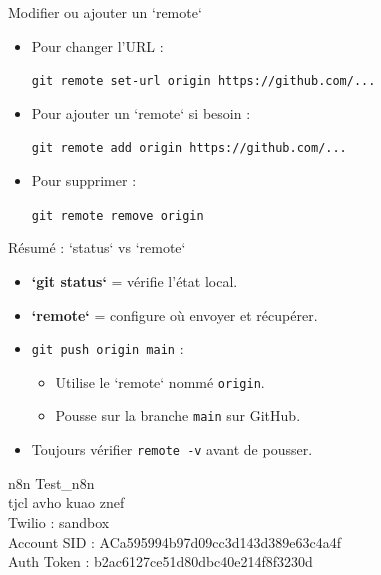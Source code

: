 \documentclass{beamer}
\begin{document}
\begin{frame}{Modifier ou ajouter un `remote`}
	\begin{itemize}
		\item Pour changer l’URL :
		\begin{block}{}
			\texttt{git remote set-url origin https://github.com/...}
		\end{block}
		\item Pour ajouter un `remote` si besoin :
		\begin{block}{}
			\texttt{git remote add origin https://github.com/...}
		\end{block}
		\item Pour supprimer :
		\begin{block}{}
			\texttt{git remote remove origin}
		\end{block}
	\end{itemize}
\end{frame}

\begin{frame}{Résumé : `status` vs `remote`}
	\begin{itemize}
		\item \textbf{`git status`} = vérifie l’état local.
		\item \textbf{`remote`} = configure où envoyer et récupérer.
		\item \texttt{git push origin main} :
		\begin{itemize}
			\item Utilise le `remote` nommé \texttt{origin}.
			\item Pousse sur la branche \texttt{main} sur GitHub.
		\end{itemize}
		\item Toujours vérifier \texttt{remote -v} avant de pousser.
	\end{itemize}
\end{frame}





\begin{frame}{n8n}
	Test\_n8n\\
tjcl avho kuao znef \\

Twilio : sandbox \\
Account SID : ACa595994b97d09cc3d143d389e63c4a4f\\
Auth Token : b2ac6127ce51d80dbc40e214f8f3230d \\
\end{frame}
\end{document}
